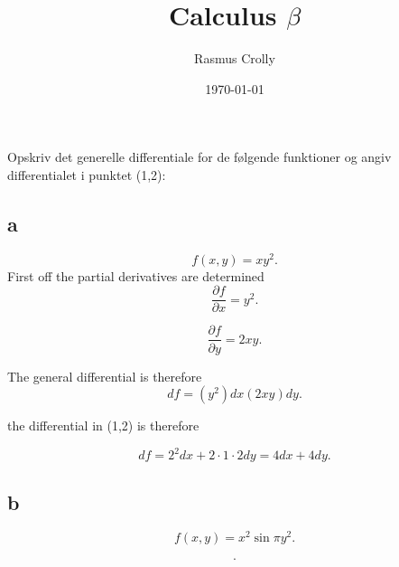 \documentclass[12pt,a4paper]{article}
\title{Calculus $\beta$}
\author{Rasmus Crolly}
\date{\today}
\begin{document}
\maketitle

Opskriv det generelle differentiale for de følgende funktioner og angiv differentialet i punktet (1,2):
\subsection{a}


\[
	f\left( x,y \right)=xy^2 
.\] 
First off the partial derivatives are determined
\[
\frac{\partial f}{\partial x}=y^2
.\] 

\[
\frac{\partial f}{\partial y}=2xy 
.\] 

The general differential is therefore \[
	df=\left( y^2 \right) dx\left( 2xy \right) dy
.\] 


the  differential in (1,2) is therefore

\[
df=2^2dx+2\cdot 1\cdot 2 dy=4dx+4dy
.\] 


\subsection{b}
\[
f\left( x,y \right) = x^2\sin{\pi y^2}
.\] 

\[

.\] 
\end{document}
